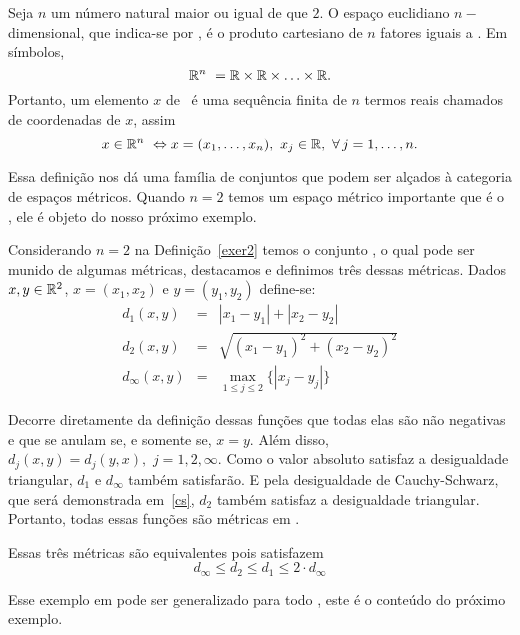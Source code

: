 \documentclass[glenn,refnum,codigo]{Estilo}
\begin{document}
\begin{define}\label{exer2}
	Seja $n$ um número natural maior ou igual de que $2$. O espaço euclidiano
	$n-$dimensional, que indica-se por \rn, é o produto cartesiano de $n$
	fatores iguais a \R. Em símbolos,
	\[
	\rn\ = \R \times \R \times \ldots \times \R.
	\]
	Portanto, um elemento $x$ de \rn\ é uma sequência finita de $n$ termos
	reais chamados de coordenadas de $x$, assim
	\[
	x \in \rn\ \Leftrightarrow x=(x_1, \ldots ,x_n),\,\,x_j \in \R,\,\,
	\forall \, j = 1, \ldots ,n.
	\]
\end{define}

Essa definição nos dá uma família de conjuntos que podem ser alçados à
categoria de espaços métricos. Quando $n=2$ temos um espaço métrico
importante que é o \rn[2], ele é objeto do nosso próximo exemplo.

\begin{exemplo}
	Considerando $n=2$ na Definição~\ref{exer2} temos o conjunto \rn[2], o qual
	pode ser munido de algumas métricas, destacamos e definimos três dessas
	métricas. Dados $x, y \in \rn[2]$, $x=(x_1,x_2)$ e $y=(y_1,y_2)$ define-se:
	\begin{eqnarray}
	d_1(x,y) &=& |x_1 - y_1| + |x_2 - y_2|  \\
	d_2(x,y) &=& \sqrt{(x_1 - y_1)^2 + (x_2 - y_2)^2} \\
	d_ \infty(x,y) &=& \max_{1 \leqslant j \leqslant 2}{\{|x_j - y_j|\}}
	\end{eqnarray}
	
	Decorre diretamente da definição dessas funções que todas elas são não
	negativas e que se anulam se, e somente se, $x=y$. Além disso,
	$d_j(x,y) = d_j(y,x),\,\, j=1,2,\infty$. Como o valor absoluto satisfaz
	a desigualdade triangular, $d_1$ e $d_\infty$ também satisfarão. E pela
	desigualdade de Cauchy-Schwarz, que será demonstrada em~\ref{cs}, $d_2$  também
	satisfaz
	a desigualdade triangular. Portanto, todas essas funções são métricas em \rn[2].
	
	Essas três métricas são equivalentes pois satisfazem
	\[
	d_\infty \leqslant d_2 \leqslant d_1 \leqslant 2 \cdot d_\infty
	\]
	
	Esse exemplo em \rn[2] pode ser generalizado para todo \rn, este é o
	conteúdo do próximo exemplo.
\end{exemplo}
\end{document}
